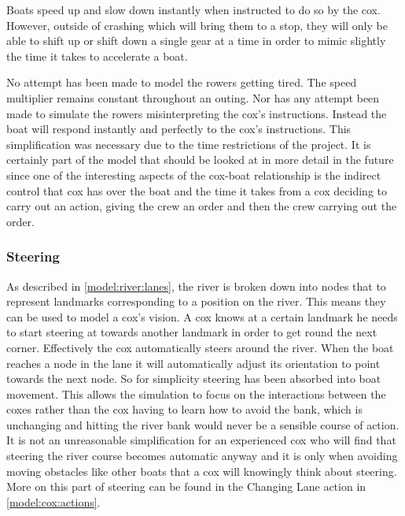       Boats speed up and slow down instantly when instructed to do so by the cox. However, outside of crashing which will bring them to a stop, they will only be able to shift up or shift down a single gear at a time in order to mimic slightly the time it takes to accelerate a boat.
      
      No attempt has been made to model the rowers getting tired. The speed multiplier remains constant throughout an outing. Nor has any attempt been made to simulate the rowers misinterpreting the cox's instructions. Instead the boat will respond instantly and perfectly to the cox's instructions. This simplification was necessary due to the time restrictions of the project. It is certainly part of the model that should be looked at in more detail in the future since one of the interesting aspects of the cox-boat relationship is the indirect control that cox has over the boat and the time it takes from a cox deciding to carry out an action, giving the crew an order and then the crew carrying out the order.
      
      \subsubsection{Steering}
      As described in \ref{model:river:lanes}, the river is broken down into nodes that to represent landmarks corresponding to a position on the river. This means they can be used to model a cox's vision. A cox knows at a certain landmark he needs to start steering at towards another landmark in order to get round the next corner. Effectively the cox automatically steers around the river. When the boat reaches a node in the lane it will automatically adjust its orientation to point towards the next node. So for simplicity steering has been absorbed into boat movement. This allows the simulation to focus on the interactions between the coxes rather than the cox having to learn how to avoid the bank, which is unchanging and hitting the river bank would never be a sensible course of action. It is not an unreasonable simplification for an experienced cox who will find that steering the river course becomes automatic anyway and it is only when avoiding moving obstacles like other boats that a cox will knowingly think about steering. More on this part of steering can be found in the Changing Lane action in \ref{model:cox:actions}.
      
